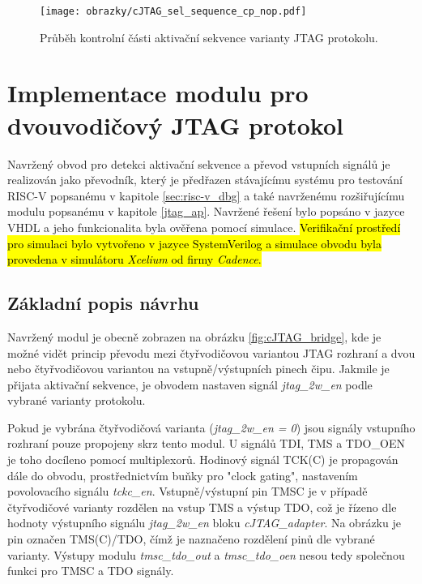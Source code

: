 \begin{figure}[!h]
  \begin{center}
    \texttt{[image: obrazky/cJTAG\_sel\_sequence\_cp\_nop.pdf]}
  \end{center}
  \caption{Průběh kontrolní části aktivační sekvence varianty \acs{JTAG} protokolu.}
	\label{fig:cJTAG_sel_cp_nop}
\end{figure}

\section{Implementace modulu pro dvouvodičový \acs{JTAG} protokol}
Navržený obvod pro detekci aktivační sekvence a převod vstupních signálů je realizován jako převodník, který je předřazen stávajícímu systému pro testování \acs{RISC-V} popsanému v kapitole \ref{sec:risc-v_dbg} a také navrženému rozšiřujícímu modulu popsanému v kapitole \ref{jtag_ap}. Navržené řešení bylo popsáno v jazyce \acs{VHDL} a jeho funkcionalita byla ověřena pomocí simulace. \hl{Verifikační prostředí pro simulaci bylo vytvořeno v jazyce SystemVerilog a simulace obvodu byla provedena v simulátoru \textit{Xcelium} od firmy \textit{Cadence}.}

\subsection{Základní popis návrhu}	\label{subsec:cJTAG_adapter}
Navržený modul je obecně zobrazen na obrázku \ref{fig:cJTAG_bridge}, kde je možné vidět princip převodu mezi čtyřvodičovou variantou \acs{JTAG} rozhraní a dvou nebo čtyřvodičovou variantou na vstupně/výstupních pinech čipu. Jakmile je přijata aktivační sekvence, je obvodem nastaven signál \textit{jtag\_2w\_en} podle vybrané varianty protokolu.

Pokud je vybrána čtyřvodičová varianta (\textit{jtag\_2w\_en = 0}) jsou signály vstupního rozhraní pouze propojeny skrz tento modul. U signálů TDI, TMS a TDO\_OEN je toho docíleno pomocí multiplexorů. Hodinový signál TCK(C) je propagován dále do obvodu, prostřednictvím buňky pro "clock gating", nastavením povolovacího signálu \textit{tckc\_en}. Vstupně/výstupní pin \acs{TMSC} je v případě čtyřvodičové varianty rozdělen na vstup TMS a výstup TDO, což je řízeno dle hodnoty výstupního signálu \textit{jtag\_2w\_en} bloku \textit{cJTAG\_adapter}. Na obrázku je pin označen TMS(C)/TDO, čímž je naznačeno rozdělení pinů dle vybrané varianty. Výstupy modulu \textit{tmsc\_tdo\_out} a \textit{tmsc\_tdo\_oen} nesou tedy společnou funkci pro \acs{TMSC} a TDO signály.

